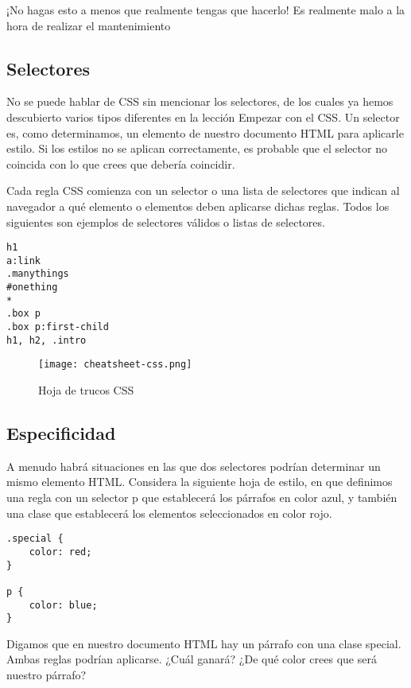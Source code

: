\begin{enumerate}
\begin{remark}
¡No hagas esto a menos que realmente tengas que hacerlo! Es realmente malo a la hora de realizar el mantenimiento 
\end{remark}

\subsection{Selectores}
No se puede hablar de CSS sin mencionar los selectores, de los cuales ya hemos descubierto varios tipos diferentes en la lección Empezar con el CSS. Un selector es, como determinamos, un elemento de nuestro documento HTML para aplicarle estilo. Si los estilos no se aplican correctamente, es probable que el selector no coincida con lo que crees que debería coincidir.

Cada regla CSS comienza con un selector o una lista de selectores que indican al navegador a qué elemento o elementos deben aplicarse dichas reglas. Todos los siguientes son ejemplos de selectores válidos o listas de selectores.

\begin{lstlisting}
h1
a:link
.manythings
#onething
*
.box p
.box p:first-child
h1, h2, .intro
\end{lstlisting}

\begin{figure}[H]
	\center
	\texttt{[image: cheatsheet-css.png]}
	\caption{Hoja de trucos CSS}
	\label{fig:super}
\end{figure}

\subsection{Especificidad}
A menudo habrá situaciones en las que dos selectores podrían determinar un mismo elemento HTML. Considera la siguiente hoja de estilo, en que definimos una regla con un selector p que establecerá los párrafos en color azul, y también una clase que establecerá los elementos seleccionados en color rojo.

\begin{lstlisting}
.special {
	color: red;
}

p {
	color: blue;
}
\end{lstlisting}

Digamos que en nuestro documento HTML hay un párrafo con una clase special. Ambas reglas podrían aplicarse. ¿Cuál ganará? ¿De qué color crees que será nuestro párrafo?


\end{enumerate}
